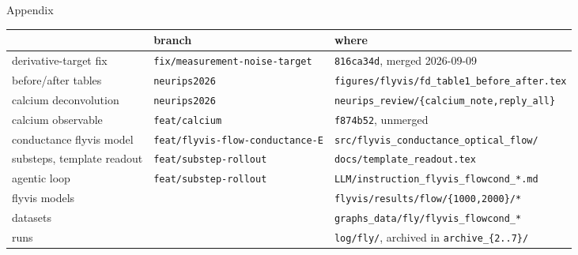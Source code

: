 \documentclass[aspectratio=169]{beamer}
\begin{document}
\begin{frame}{Appendix}
\vspace*{0.4cm}
\centering\scriptsize
\setlength{\tabcolsep}{6pt}
\begin{tabular}{lll}
\toprule
 & branch & where \\
\midrule
derivative-target fix & \texttt{fix/measurement-noise-target}
  & \texttt{816ca34d}, merged 2026-09-09 \\
before/after tables & \texttt{neurips2026}
  & \texttt{figures/flyvis/fd\_table1\_before\_after.tex} \\
calcium deconvolution & \texttt{neurips2026}
  & \texttt{neurips\_review/\{calcium\_note,reply\_all\}} \\
calcium observable & \texttt{feat/calcium}
  & \texttt{f874b52}, unmerged \\
conductance flyvis model & \texttt{feat/flyvis-flow-conductance-E}
  & \texttt{src/flyvis\_conductance\_optical\_flow/} \\
substeps, template readout & \texttt{feat/substep-rollout}
  & \texttt{docs/template\_readout.tex} \\
agentic loop & \texttt{feat/substep-rollout}
  & \texttt{LLM/instruction\_flyvis\_flowcond\_*.md} \\
\midrule
flyvis models & & \texttt{flyvis/results/flow/\{1000,2000\}/*} \\
datasets & & \texttt{graphs\_data/fly/flyvis\_flowcond\_*} \\
runs & & \texttt{log/fly/}, archived in \texttt{archive\_\{2..7\}/} \\
\bottomrule
\end{tabular}
\end{frame}
\end{document}
